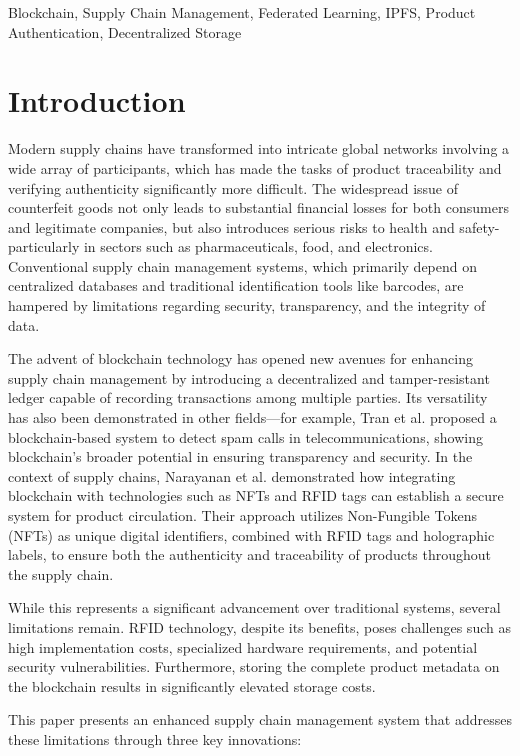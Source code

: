 \documentclass[conference]{IEEEtran}
\begin{document}
\begin{IEEEkeywords}
Blockchain, Supply Chain Management, Federated Learning, IPFS, Product Authentication, Decentralized Storage
\end{IEEEkeywords}

\section{Introduction}
Modern supply chains have transformed into intricate global networks involving a wide array of participants, which has made the tasks of product traceability and verifying authenticity significantly more difficult. The widespread issue of counterfeit goods not only leads to substantial financial losses for both consumers and legitimate companies, but also introduces serious risks to health and safety-particularly in sectors such as pharmaceuticals, food, and electronics. Conventional supply chain management systems, which primarily depend on centralized databases and traditional identification tools like barcodes, are hampered by limitations regarding security, transparency, and the integrity of data.

The advent of blockchain technology has opened new avenues for enhancing supply chain management by introducing a decentralized and tamper-resistant ledger capable of recording transactions among multiple parties. Its versatility has also been demonstrated in other fields—for example, Tran et al.\cite{tran2024sentinelcall} proposed a blockchain-based system to detect spam calls in telecommunications, showing blockchain's broader potential in ensuring transparency and security. In the context of supply chains, Narayanan et al.\cite{narayanan2024role} demonstrated how integrating blockchain with technologies such as NFTs and RFID tags can establish a secure system for product circulation. Their approach utilizes Non-Fungible Tokens (NFTs) as unique digital identifiers, combined with RFID tags and holographic labels, to ensure both the authenticity and traceability of products throughout the supply chain.

While this represents a significant advancement over traditional systems, several limitations remain. RFID technology, despite its benefits, poses challenges such as high implementation costs, specialized hardware requirements, and potential security vulnerabilities. Furthermore, storing the complete product metadata on the blockchain results in significantly elevated storage costs.

This paper presents an enhanced supply chain management system that addresses these limitations through three key innovations:
\end{document}
